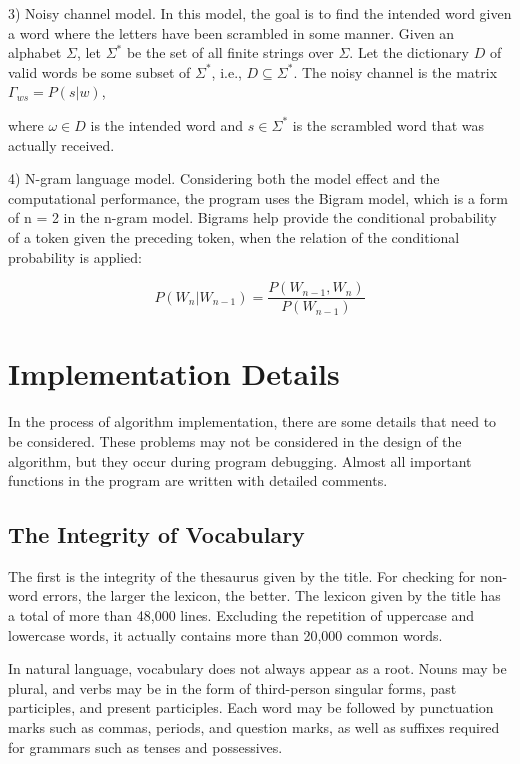 \documentclass{article}
\begin{document}
3) Noisy channel model. In this model, the goal is to find the intended word given a word where the letters have been scrambled in some manner.
Given an alphabet $\Sigma$, let $\Sigma^{*}$ be the set of all finite strings over $\Sigma$. Let the dictionary $D$ of valid words be some subset of $\Sigma^{*}$, i.e., $D\subseteq\Sigma^{*}$. The noisy channel is the matrix $\varGamma_{ws}=P(s|w)$,

where $\omega\in D$ is the intended word and $s\in\Sigma^{*}$ is the scrambled word that was actually received.

4) N-gram language model. Considering both the model effect and the
computational performance, the program uses the Bigram model, which
is a form of n = 2 in the n-gram model. Bigrams help provide the conditional
probability of a token given the preceding token, when the relation
of the conditional probability is applied:

$$
P(W_{n}|W_{n-1})=\frac{P(W_{n-1},W_{n})}{P(W_{n-1})}
$$

\section{Implementation Details}

\label{sec:implementation-details}

In the process of algorithm implementation, there are some details that need to be considered. These problems may not be considered in the design of the algorithm, but they occur during program debugging. Almost all important functions in the program are written with detailed comments.

\subsection{The Integrity of Vocabulary}

The first is the integrity of the thesaurus given by the title. For
checking for non-word errors, the larger the lexicon, the better.
The lexicon given by the title has a total of more than 48,000 lines.
Excluding the repetition of uppercase and lowercase words, it actually
contains more than 20,000 common words.

In natural language, vocabulary does not always appear as a root.
Nouns may be plural, and verbs may be in the form of third-person
singular forms, past participles, and present participles. Each word
may be followed by punctuation marks such as commas, periods, and
question marks, as well as suffixes required for grammars such as
tenses and possessives.
\end{document}

